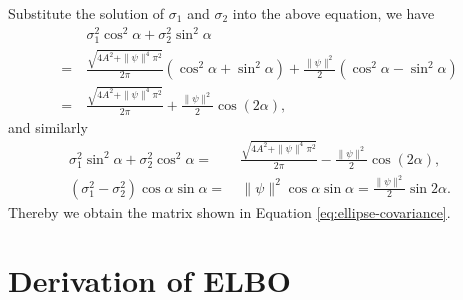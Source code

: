 \documentclass[journal]{IEEEtran}
\begin{document}
Substitute the solution of $\sigma_1$ and $\sigma_2$ into the above equation, we have
\[
\begin{aligned}
  &~\sigma_1^2\cos^2 \alpha + \sigma_2^2 \sin^2\alpha \\
  = &~\frac{\sqrt{4A^2 + \|\psi\|^4\pi^2}}{2\pi} (\cos^2 \alpha + \sin^2 \alpha) + \frac{\|\psi\|^2}{2} (\cos^2 \alpha - \sin^2 \alpha)  \\
  = &~\frac{\sqrt{4A^2 + \|\psi\|^4\pi^2}}{2\pi} + \frac{\|\psi\|^2}{2} \cos(2\alpha),
\end{aligned}
\]
and similarly
\begin{align*}
    \sigma_1^2\sin^2 \alpha + \sigma_2^2 \cos^2\alpha = &~ \frac{\sqrt{4A^2 + \|\psi\|^4\pi^2}}{2\pi} - \frac{\|\psi\|^2}{2} \cos(2\alpha),\\
    (\sigma_1^2 - \sigma_2^2)\cos{\alpha}\sin{\alpha}=&~\|\psi\|^2\cos{\alpha}\sin{\alpha}=\frac{\|\psi\|^2}{2}\sin{2\alpha}.
\end{align*}
Thereby we obtain the matrix shown in Equation \eqref{eq:ellipse-covariance}.

\section{Derivation of ELBO}
\label{append:elbo}
\end{document}
